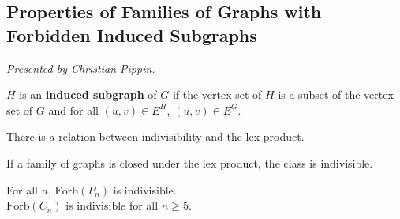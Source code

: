 \documentclass[12pt]{amsart}
\begin{document}
\subsection{Properties of Families of Graphs with Forbidden Induced Subgraphs}

\textit{}
\vspace{0.25cm}

\textit{Presented by Christian Pippin.}

\begin{definition}
$H$ is an \textbf{induced subgraph} of $G$ if the vertex set of $H$ is a subset of the vertex set of $G$ and for all $(u, v) \in E^{H}$, $(u, v) \in E^G.$
\end{definition}

There is a relation between indivisibility and the lex product. \\

\begin{lemma}
If a family of graphs is closed under the lex product, the class is indivisible.
\end{lemma}

\begin{theorem}
For all $n$, $\mathrm{Forb}(P_n)$ is indivisible. \\

$\mathrm{Forb}(C_n)$ is indivisible for all $n \geq 5.$
\end{theorem}
\end{document}
